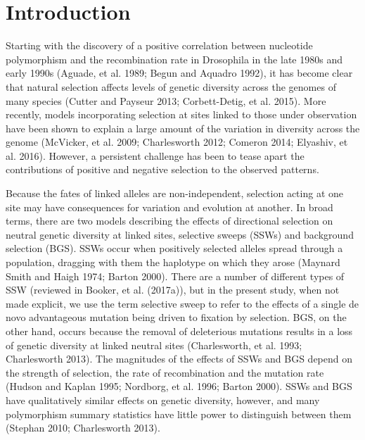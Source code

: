\section{Introduction}
 
Starting with the discovery of a positive correlation between nucleotide polymorphism and the recombination rate in Drosophila in the late 1980s and early 1990s (Aguade, et al. 1989; Begun and Aquadro 1992), it has become clear that natural selection affects levels of genetic diversity across the genomes of many species (Cutter and Payseur 2013; Corbett-Detig, et al. 2015). More recently, models incorporating selection at sites linked to those under observation have been shown to explain a large amount of the variation in diversity across the genome (McVicker, et al. 2009; Charlesworth 2012; Comeron 2014; Elyashiv, et al. 2016). However, a persistent challenge has been to tease apart the contributions of positive and negative selection to the observed patterns.

Because the fates of linked alleles are non-independent, selection acting at one site may have consequences for variation and evolution at another. In broad terms, there are two models describing the effects of directional selection on neutral genetic diversity at linked sites, selective sweeps (SSWs) and background selection (BGS). SSWs occur when positively selected alleles spread through a population, dragging with them the haplotype on which they arose (Maynard Smith and Haigh 1974; Barton 2000). There are a number of different types of SSW (reviewed in Booker, et al. (2017a)), but in the present study, when not made explicit, we use the term selective sweep to refer to the effects of a single de novo advantageous mutation being driven to fixation by selection. BGS, on the other hand, occurs because the removal of deleterious mutations results in a loss of genetic diversity at linked neutral sites (Charlesworth, et al. 1993; Charlesworth 2013). The magnitudes of the effects of SSWs and BGS depend on the strength of selection, the rate of recombination and the mutation rate (Hudson and Kaplan 1995; Nordborg, et al. 1996; Barton 2000). SSWs and BGS have qualitatively similar effects on genetic diversity, however, and many polymorphism summary statistics have little power to distinguish between them (Stephan 2010; Charlesworth 2013). 

